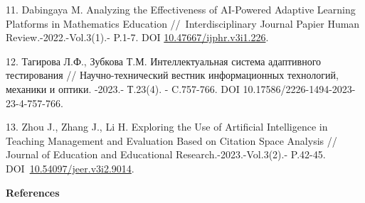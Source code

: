 \begin{refs}
11. Dabingaya M. Analyzing the Effectiveness of AI-Powered Adaptive
Learning Platforms in Mathematics Education //~Interdisciplinary Journal
Papier Human Review.-2022.-Vol.3(1).- P.1-7. DOI
\href{https://doi.org/10.47667/ijphr.v3i1.226}{10.47667/ijphr.v3i1.226}.

12. Тагирова Л.Ф., Зубкова Т.М. Интеллектуальная система адаптивного
тестирования // Научно-технический вестник информационных технологий,
механики и оптики. -2023.- Т.23(4). - C.757-766. DOI
10.17586/2226-1494-2023-23-4-757-766.

13. Zhou J., Zhang J., Li H. Exploring the Use of Artificial
Intelligence in Teaching Management and Evaluation Based on Citation
Space Analysis // Journal of Education and Educational
Research.-2023.-Vol.3(2).- P.42-45.
DOI~\href{https://doi.org/10.54097/jeer.v3i2.9014}{10.54097/jeer.v3i2.9014}.
\end{refs}

\begin{center}
{\bfseries References}
\end{center}


